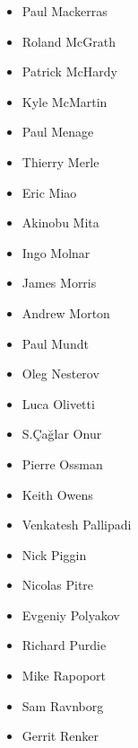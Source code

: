 \documentclass[a4paper,8pt,english]{sphinxmanual}
\begin{document}
\begin{itemize}
\item {} 
Paul Mackerras

\item {} 
Roland McGrath

\item {} 
Patrick McHardy

\item {} 
Kyle McMartin

\item {} 
Paul Menage

\item {} 
Thierry Merle

\item {} 
Eric Miao

\item {} 
Akinobu Mita

\item {} 
Ingo Molnar

\item {} 
James Morris

\item {} 
Andrew Morton

\item {} 
Paul Mundt

\item {} 
Oleg Nesterov

\item {} 
Luca Olivetti

\item {} 
S.Çağlar Onur

\item {} 
Pierre Ossman

\item {} 
Keith Owens

\item {} 
Venkatesh Pallipadi

\item {} 
Nick Piggin

\item {} 
Nicolas Pitre

\item {} 
Evgeniy Polyakov

\item {} 
Richard Purdie

\item {} 
Mike Rapoport

\item {} 
Sam Ravnborg

\item {} 
Gerrit Renker


\end{itemize}
\end{document}
